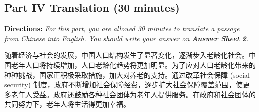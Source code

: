 \documentclass[UTF8,11pt]{ctexart}
\begin{document}
\subsection*{\textbf{Part IV Translation} \textbf{(30 minutes)}}


\textbf{Directions: }\textit{For this part, you are allowed 30 minutes to translate a passage from Chinese into English. You} \textit{should write your answer on }\textbf{\textit{Answer Sheet 2}}\textit{.}


随着经济与社会的发展，中国人口结构发生了显著变化，逐渐步入老龄化社会。中国老年人口将持续增加，人口老龄化趋势将更加明显。为了应对人口老龄化带来的种种挑战，国家正积极采取措施，加大对养老的支持。通过改革社会保障 (social security) 制度，政府不断增加社会保障经费，逐步扩大社会保障覆盖范围，使更多老年人受益。政府还鼓励各种社会团体为老年人提供服务。在政府和社会团体的共同努力下，老年人将生活得更加幸福。
\end{document}
